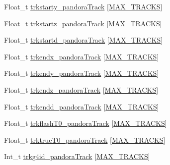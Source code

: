 \begin{DoxyCompactItemize}
\item 
Float\-\_\-t \hyperlink{classanatree_af0abb36deb6c63c9faea5f7d68738d92}{trkstarty\-\_\-pandora\-Track} \mbox{[}\hyperlink{anatree__core__v09410002__orig_8h_a327fd4e796e4a0d78947524c96e4362e}{M\-A\-X\-\_\-\-T\-R\-A\-C\-K\-S}\mbox{]}
\item 
Float\-\_\-t \hyperlink{classanatree_a9e39d6a03eec25296bebc762fba3725a}{trkstartz\-\_\-pandora\-Track} \mbox{[}\hyperlink{anatree__core__v09410002__orig_8h_a327fd4e796e4a0d78947524c96e4362e}{M\-A\-X\-\_\-\-T\-R\-A\-C\-K\-S}\mbox{]}
\item 
Float\-\_\-t \hyperlink{classanatree_ab68e19c86f192013127b72bf110742fe}{trkstartd\-\_\-pandora\-Track} \mbox{[}\hyperlink{anatree__core__v09410002__orig_8h_a327fd4e796e4a0d78947524c96e4362e}{M\-A\-X\-\_\-\-T\-R\-A\-C\-K\-S}\mbox{]}
\item 
Float\-\_\-t \hyperlink{classanatree_a7b98607750a75c31e93911fd2a6b7d93}{trkendx\-\_\-pandora\-Track} \mbox{[}\hyperlink{anatree__core__v09410002__orig_8h_a327fd4e796e4a0d78947524c96e4362e}{M\-A\-X\-\_\-\-T\-R\-A\-C\-K\-S}\mbox{]}
\item 
Float\-\_\-t \hyperlink{classanatree_a8e86649f69570da1a7558c900d034f96}{trkendy\-\_\-pandora\-Track} \mbox{[}\hyperlink{anatree__core__v09410002__orig_8h_a327fd4e796e4a0d78947524c96e4362e}{M\-A\-X\-\_\-\-T\-R\-A\-C\-K\-S}\mbox{]}
\item 
Float\-\_\-t \hyperlink{classanatree_ac496000d1ab5e9df726be9479b555267}{trkendz\-\_\-pandora\-Track} \mbox{[}\hyperlink{anatree__core__v09410002__orig_8h_a327fd4e796e4a0d78947524c96e4362e}{M\-A\-X\-\_\-\-T\-R\-A\-C\-K\-S}\mbox{]}
\item 
Float\-\_\-t \hyperlink{classanatree_a7d2564f9236dcb1f4e46a12f8c1c3718}{trkendd\-\_\-pandora\-Track} \mbox{[}\hyperlink{anatree__core__v09410002__orig_8h_a327fd4e796e4a0d78947524c96e4362e}{M\-A\-X\-\_\-\-T\-R\-A\-C\-K\-S}\mbox{]}
\item 
Float\-\_\-t \hyperlink{classanatree_a0d362559e2753b7fea4325c329652bbc}{trkflash\-T0\-\_\-pandora\-Track} \mbox{[}\hyperlink{anatree__core__v09410002__orig_8h_a327fd4e796e4a0d78947524c96e4362e}{M\-A\-X\-\_\-\-T\-R\-A\-C\-K\-S}\mbox{]}
\item 
Float\-\_\-t \hyperlink{classanatree_a2f8def2074189a5c4ca452123bfdb752}{trktrue\-T0\-\_\-pandora\-Track} \mbox{[}\hyperlink{anatree__core__v09410002__orig_8h_a327fd4e796e4a0d78947524c96e4362e}{M\-A\-X\-\_\-\-T\-R\-A\-C\-K\-S}\mbox{]}
\item 
Int\-\_\-t \hyperlink{classanatree_a3f305344ffa47d19d64ba4191b7b4295}{trkg4id\-\_\-pandora\-Track} \mbox{[}\hyperlink{anatree__core__v09410002__orig_8h_a327fd4e796e4a0d78947524c96e4362e}{M\-A\-X\-\_\-\-T\-R\-A\-C\-K\-S}\mbox{]}

\end{DoxyCompactItemize}
